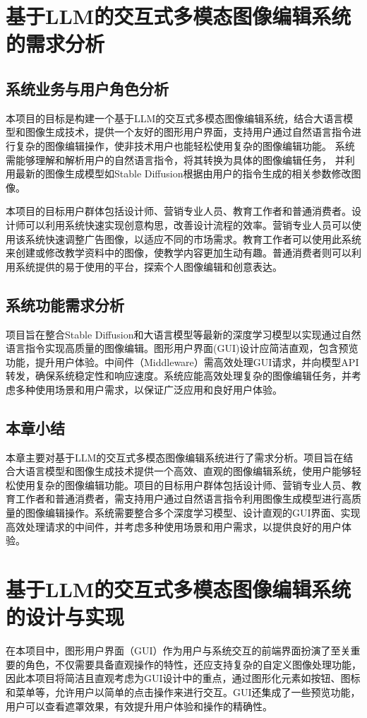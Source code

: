 \documentclass[a4paper,AutoFakeBold,oneside,12pt]{book}
\begin{document}
\chapter{基于LLM的交互式多模态图像编辑系统的需求分析}
\section{系统业务与用户角色分析}
本项目的目标是构建一个基于LLM的交互式多模态图像编辑系统，结合大语言模型和图像生成技术，提供一个友好的图形用户界面，支持用户通过自然语言指令进行复杂的图像编辑操作，使非技术用户也能轻松使用复杂的图像编辑功能。
系统需能够理解和解析用户的自然语言指令，将其转换为具体的图像编辑任务，
并利用最新的图像生成模型如Stable Diffusion根据由用户的指令生成的相关参数修改图像。

本项目的目标用户群体包括设计师、营销专业人员、教育工作者和普通消费者。设计师可以利用系统快速实现创意构思，改善设计流程的效率。营销专业人员可以使用该系统快速调整广告图像，以适应不同的市场需求。教育工作者可以使用此系统来创建或修改教学资料中的图像，使教学内容更加生动有趣。普通消费者则可以利用系统提供的易于使用的平台，探索个人图像编辑和创意表达。

\section{系统功能需求分析}
项目旨在整合Stable Diffusion和大语言模型等最新的深度学习模型以实现通过自然语言指令实现高质量的图像编辑。图形用户界面(GUI)设计应简洁直观，包含预览功能，提升用户体验。中间件（Middleware）需高效处理GUI请求，并向模型API转发，确保系统稳定性和响应速度。系统应能高效处理复杂的图像编辑任务，并考虑多种使用场景和用户需求，以保证广泛应用和良好用户体验。

\section{本章小结}
本章主要对基于LLM的交互式多模态图像编辑系统进行了需求分析。项目旨在结合大语言模型和图像生成技术提供一个高效、直观的图像编辑系统，使用户能够轻松使用复杂的图像编辑功能。项目的目标用户群体包括设计师、营销专业人员、教育工作者和普通消费者，需支持用户通过自然语言指令利用图像生成模型进行高质量的图像编辑操作。系统需要整合多个深度学习模型、设计直观的GUI界面、实现高效处理请求的中间件，并考虑多种使用场景和用户需求，以提供良好的用户体验。


\chapter{基于LLM的交互式多模态图像编辑系统的设计与实现}
在本项目中，图形用户界面（GUI）作为用户与系统交互的前端界面扮演了至关重要的角色，不仅需要具备直观操作的特性，还应支持复杂的自定义图像处理功能，因此本项目将简洁且直观考虑为GUI设计中的重点，通过图形化元素如按钮、图标和菜单等，允许用户以简单的点击操作来进行交互。GUI还集成了一些预览功能，用户可以查看遮罩效果，有效提升用户体验和操作的精确性。
\end{document}
